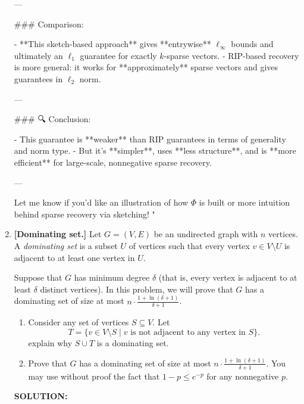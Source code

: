 \begin{enumerate}
\begin{shaded}
  ---
  
  ### Comparison:
  
  - **This sketch-based approach** gives **entrywise** \(\ell_\infty\) bounds and ultimately an \(\ell_1\) guarantee for exactly \(k\)-sparse vectors.
  - RIP-based recovery is more general: it works for **approximately** sparse vectors and gives guarantees in \(\ell_2\) norm.
  
  ---
  
  ### 🔍 Conclusion:
  
  - This guarantee is **weaker** than RIP guarantees in terms of generality and norm type.
  - But it's **simpler**, uses **less structure**, and is **more efficient** for large-scale, nonnegative sparse recovery.
  
  ---
  
  Let me know if you'd like an illustration of how \(\Phi\) is built or more intuition behind sparse recovery via sketching!
"

\fi
\end{shaded}
\fi


\item {} \textbf{[Dominating set.]}
Let $G=(V,E)$ be an undirected graph with $n$ vertices. A \emph{dominating set} is a subset $U$ of vertices such that every vertex $v\in V\setminus U$ is adjacent to at least one vertex in $U$. 

Suppose that $G$ has minimum degree $\delta$ (that is, every vertex is adjacent to at least $\delta$ distinct vertices). In this problem, we will prove that $G$ has a dominating set of size at most $n\cdot \frac{1+\ln(\delta+1)}{\delta+1}$.

\begin{enumerate}
\item {} Consider any set of vertices $S\subseteq V$. Let 
\[T=\{v\in V\setminus S\mid v\text{ is not adjacent to any vertex in }S\}.\]
explain why $S\cup T$ is a dominating set. 


\item {} Prove that $G$ has a dominating set of size at most $n\cdot \frac{1+\ln(\delta+1)}{\delta+1}$. You may use without proof the fact that $1-p\leq e^{-p}$ for any nonnegative $p$.


\end{enumerate}
\ifdefined\template
\begin{shaded}
\textbf{SOLUTION:}
\ifdefined\sol



\end{shaded}
\end{enumerate}

